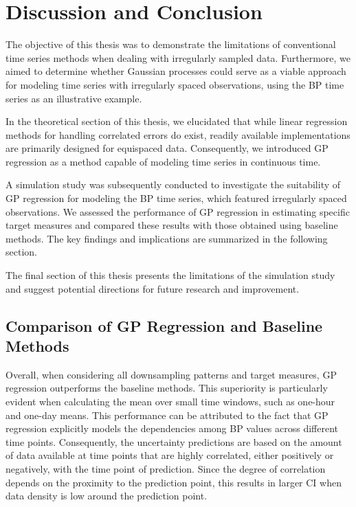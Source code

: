 \chapter{Discussion and Conclusion}\label{ch:discussion-and-conclusion}

The objective of this thesis was to demonstrate the limitations of conventional
time series methods when dealing with irregularly sampled data.
Furthermore, we aimed to determine whether Gaussian processes could serve as a
viable approach for modeling time series with irregularly spaced observations,
using the BP time series as an illustrative example.

In the theoretical section of this thesis, we elucidated that while linear
regression methods for handling correlated errors do exist, readily available
implementations are primarily designed for equispaced data.
Consequently, we introduced GP regression as a method capable of modeling
time series in continuous time.

A simulation study was subsequently conducted to investigate
the suitability of GP regression for modeling the BP time series,
which featured irregularly spaced observations. We assessed the performance of
GP regression in estimating specific target measures and compared these
results with those obtained using baseline methods.
The key findings and implications are summarized in the following section.

The final section of this thesis presents the limitations of the
simulation study and suggest potential directions
for future research and improvement.

\section{Comparison of GP Regression and Baseline Methods}

Overall, when considering all downsampling patterns and target measures,
GP regression outperforms the baseline methods. This superiority is particularly
evident when calculating the mean over small time windows, such as one-hour and one-day means.
This performance can be attributed to the fact that GP regression explicitly models
the dependencies among BP values across different time points. Consequently,
the uncertainty predictions are based on the amount of data available at time
points that are highly correlated, either positively or negatively, with the time
point of prediction.
Since the degree of correlation depends on the proximity to the prediction point,
this results in larger CI when data density is low around the prediction point.

